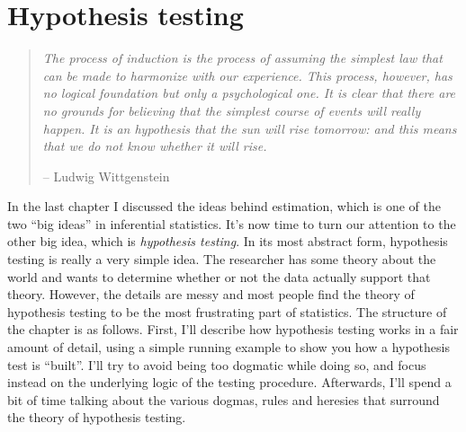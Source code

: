 
\chapter{Hypothesis testing\label{ch:hypothesistesting}}

\begin{quote}
{\it The process of induction is the process of assuming the simplest law that can be made to harmonize with our experience. This process, however, has no logical foundation but only a psychological one. It is clear that there are no grounds for believing that the simplest course of events will really happen. It is an hypothesis that the sun will rise tomorrow: and this means that we do not know whether it will rise.} 

\hspace*{2cm} -- Ludwig Wittgenstein
\end{quote}
\vspace*{12pt}

\noindent
In the last chapter I discussed the ideas behind estimation, which is one of the two ``big ideas'' in inferential statistics. It's now time to turn our attention to the other big idea, which is {\it hypothesis testing}. In its most abstract form, hypothesis testing is really a very simple idea. The researcher has some theory about the world and wants to determine whether or not the data actually support that theory. However, the details are messy and most people find the theory of hypothesis testing to be the most frustrating part of statistics. The structure of the chapter is as follows. First, I'll describe how hypothesis testing works in a fair amount of detail, using a simple running example to show you how a hypothesis test is ``built''. I'll try to avoid being too dogmatic while doing so, and focus instead on the underlying logic of the testing procedure. Afterwards, I'll spend a bit of time talking about the various dogmas, rules and heresies that surround the theory of hypothesis testing. 


